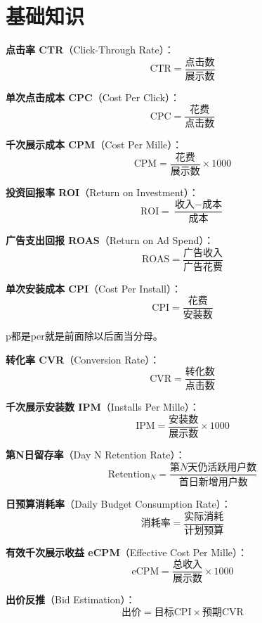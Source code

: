 \chapter{基础知识}
\begin{definition}[广告投放核心指标]

\textbf{点击率 CTR}（Click-Through Rate）：
$$\text{CTR} = \frac{\text{点击数}}{\text{展示数}}$$

\textbf{单次点击成本 CPC}（Cost Per Click）：
$$\text{CPC} = \frac{\text{花费}}{\text{点击数}}$$

\textbf{千次展示成本 CPM}（Cost Per Mille）：
$$\text{CPM} = \frac{\text{花费}}{\text{展示数}} \times 1000$$

\textbf{投资回报率 ROI}（Return on Investment）：
$$\text{ROI} = \frac{\text{收入} - \text{成本}}{\text{成本}}$$

\textbf{广告支出回报 ROAS}（Return on Ad Spend）：
$$\text{ROAS} = \frac{\text{广告收入}}{\text{广告花费}}$$

\textbf{单次安装成本 CPI}（Cost Per Install）：
$$\text{CPI} = \frac{\text{花费}}{\text{安装数}}$$

\end{definition}
\begin{dxtips}
    p都是per就是前面除以后面当分母。
\end{dxtips}
\begin{definition}[转化漏斗类指标]

\textbf{转化率 CVR}（Conversion Rate）：
$$\text{CVR} = \frac{\text{转化数}}{\text{点击数}}$$

\textbf{千次展示安装数 IPM}（Installs Per Mille）：
$$\text{IPM} = \frac{\text{安装数}}{\text{展示数}} \times 1000$$

\textbf{第N日留存率}（Day N Retention Rate）：
$$\text{Retention}_N = \frac{\text{第}N\text{天仍活跃用户数}}{\text{首日新增用户数}}$$

\end{definition}

\begin{definition}[预算与出价类指标]

\textbf{日预算消耗率}（Daily Budget Consumption Rate）：
$$\text{消耗率} = \frac{\text{实际消耗}}{\text{计划预算}}$$

\textbf{有效千次展示收益 eCPM}（Effective Cost Per Mille）：
$$\text{eCPM} = \frac{\text{总收入}}{\text{展示数}} \times 1000$$

\textbf{出价反推}（Bid Estimation）：
$$\text{出价} = \text{目标CPI} \times \text{预期CVR}$$

\end{definition}

